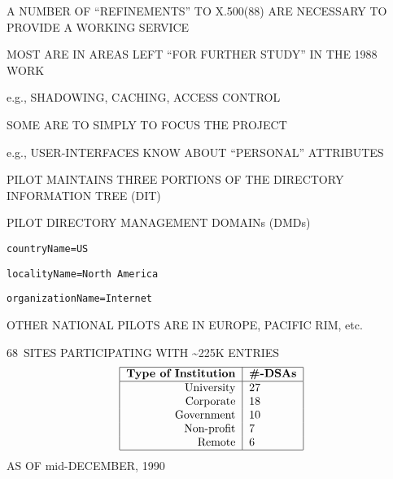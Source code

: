 \begin{bwslide}

\begin{nrtc}
\item	A NUMBER OF ``REFINEMENTS'' TO X.500(88) ARE NECESSARY TO PROVIDE A
	WORKING SERVICE

\item	MOST ARE IN AREAS LEFT ``FOR FURTHER STUDY'' IN THE 1988 WORK
    \begin{nrtc}
    \item	e.g., SHADOWING, CACHING, ACCESS CONTROL
    \end{nrtc}

\item	SOME ARE TO SIMPLY TO FOCUS THE PROJECT
    \begin{nrtc}
    \item	e.g., USER-INTERFACES KNOW ABOUT ``PERSONAL'' ATTRIBUTES
    \end{nrtc}
\end{nrtc}
\end{bwslide}


\begin{bwslide}

\begin{nrtc}
\item	PILOT MAINTAINS THREE PORTIONS OF THE DIRECTORY INFORMATION TREE (DIT)


\item	PILOT DIRECTORY MANAGEMENT DOMAINs (DMDs)
    \begin{nrtc}
    \item	\verb"countryName=US"

    \item	\verb"localityName=North America"

    \item	\verb"organizationName=Internet"
    \end{nrtc}

\item	OTHER NATIONAL PILOTS ARE IN EUROPE, PACIFIC RIM, etc.
\end{nrtc}
\end{bwslide}


\begin{bwslide}

\begin{nrtc}
\item	68~SITES PARTICIPATING WITH \~{}225K ENTRIES
\[\begin{tabular}{|r|l|}
\hline
\bf Type of Institution&
		\bf \#-DSAs\\
\hline
University&	27\\
Corporate&	18\\
Government&	10\\
Non-profit&	7\\
Remote&		6\\
\hline
\end{tabular}\]
AS OF mid-DECEMBER, 1990
\end{nrtc}
\end{bwslide}



